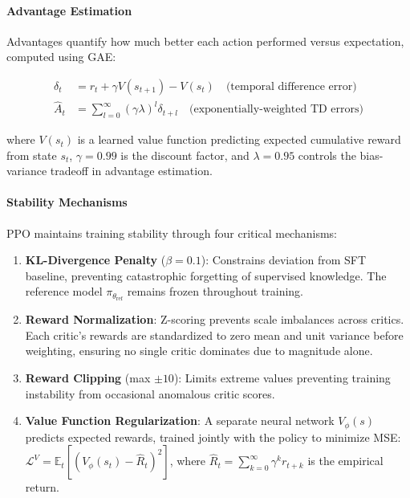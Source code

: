\documentclass[11pt]{article}
\begin{document}
\paragraph{Advantage Estimation}
Advantages quantify how much better each action performed versus expectation, computed using GAE:

\begin{align}
\delta_t &= r_t + \gamma V(s_{t+1}) - V(s_t) \quad \text{(temporal difference error)} \\
\hat{A}_t &= \sum_{l=0}^{\infty} (\gamma \lambda)^l \delta_{t+l} \quad \text{(exponentially-weighted TD errors)}
\end{align}

where $V(s_t)$ is a learned value function predicting expected cumulative reward from state $s_t$, $\gamma=0.99$ is the discount factor, and $\lambda=0.95$ controls the bias-variance tradeoff in advantage estimation.

\paragraph{Stability Mechanisms}
PPO maintains training stability through four critical mechanisms:

\begin{enumerate}
    \item \textbf{KL-Divergence Penalty} ($\beta=0.1$): Constrains deviation from SFT baseline, preventing catastrophic forgetting of supervised knowledge. The reference model $\pi_{\theta_{\text{ref}}}$ remains frozen throughout training.
    
    \item \textbf{Reward Normalization}: Z-scoring prevents scale imbalances across critics. Each critic's rewards are standardized to zero mean and unit variance before weighting, ensuring no single critic dominates due to magnitude alone.
    
    \item \textbf{Reward Clipping} (max $\pm10$): Limits extreme values preventing training instability from occasional anomalous critic scores.
    
    \item \textbf{Value Function Regularization}: A separate neural network $V_\phi(s)$ predicts expected rewards, trained jointly with the policy to minimize MSE: $\mathcal{L}^V = \mathbb{E}_t[(V_\phi(s_t) - \hat{R}_t)^2]$, where $\hat{R}_t = \sum_{k=0}^{\infty} \gamma^k r_{t+k}$ is the empirical return.
\end{enumerate}
\end{document}

